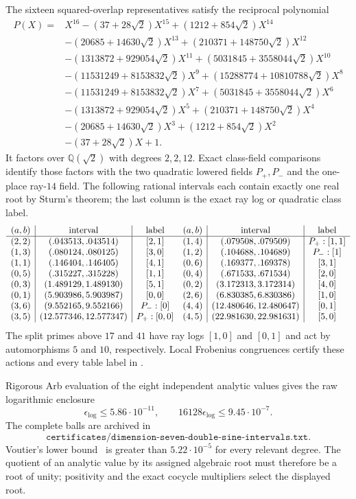 \documentclass[11pt]{article}
\newcommand{\Q}{\mathbb Q}
\begin{document}
The sixteen squared-overlap representatives satisfy the reciprocal
polynomial
\[
\begin{aligned}
P(X)={}&X^{16}-(37+28\sqrt2)X^{15}
 +(1212+854\sqrt2)X^{14}\\
&-(20685+14630\sqrt2)X^{13}
 +(210371+148750\sqrt2)X^{12}\\
&-(1313872+929054\sqrt2)X^{11}
 +(5031845+3558044\sqrt2)X^{10}\\
&-(11531249+8153832\sqrt2)X^9
 +(15288774+10810788\sqrt2)X^8\\
&-(11531249+8153832\sqrt2)X^7
 +(5031845+3558044\sqrt2)X^6\\
&-(1313872+929054\sqrt2)X^5
 +(210371+148750\sqrt2)X^4\\
&-(20685+14630\sqrt2)X^3
 +(1212+854\sqrt2)X^2\\
&-(37+28\sqrt2)X+1.
\end{aligned}
\]
It factors over $\Q(\sqrt2)$ with degrees $2,2,12$. Exact
class-field comparisons identify those factors with the two quadratic
lowered fields $P_+,P_-$ and the one-place ray-$14$ field. The
following rational intervals each contain exactly one real root by
Sturm's theorem; the last column is the exact ray log or quadratic
class label.
\[
\begin{array}{c|c|c@{\quad}c|c|c}
(a,b)&\text{interval}&\text{label}&(a,b)&\text{interval}&\text{label}\\ \hline
(2,2)&(.043513,.043514)&[2,1]&(1,4)&(.079508,.079509)&P_+:[1,1]\\
(1,3)&(.080124,.080125)&[3,0]&(1,2)&(.104688,.104689)&P_-:[1]\\
(1,1)&(.146404,.146405)&[4,1]&(0,6)&(.169377,.169378)&[3,1]\\
(0,5)&(.315227,.315228)&[1,1]&(0,4)&(.671533,.671534)&[2,0]\\
(0,3)&(1.489129,1.489130)&[5,1]&(0,2)&(3.172313,3.172314)&[4,0]\\
(0,1)&(5.903986,5.903987)&[0,0]&(2,6)&(6.830385,6.830386)&[1,0]\\
(3,6)&(9.552165,9.552166)&P_-:[0]&(4,4)&(12.480646,12.480647)&[0,1]\\
(3,5)&(12.577346,12.577347)&P_+:[0,0]&(4,5)&(22.981630,22.981631)&[5,0]
\end{array}
\]
The split primes above $17$ and $41$ have ray logs $[1,0]$ and
$[0,1]$ and act by automorphisms $5$ and $10$, respectively. Local
Frobenius congruences certify these actions and every table label in
.

Rigorous Arb evaluation of the eight independent analytic values gives
the raw logarithmic enclosure
\[
 \epsilon_{\log}\le 5.86\cdot10^{-11},\qquad
 16128\epsilon_{\log}\le9.45\cdot10^{-7}.
\]
The complete balls are archived in
\[
\texttt{certificates/dimension-seven-double-sine-intervals.txt}.
\]
Voutier's lower bound~\cite{Voutier1996} is greater than
$5.22\cdot10^{-5}$ for every relevant degree. The quotient of an
analytic value by its assigned algebraic root must therefore be a root
of unity; positivity and the exact cocycle multipliers select the
displayed root.
\end{document}
